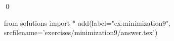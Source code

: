 
\begin{ex} 
  \label{ex:minimization9}
  
  \qed
\end{ex} 
\begin{python0}
from solutions import *
add(label="ex:minimization9",
    srcfilename='exercises/minimization9/answer.tex') 
\end{python0}

